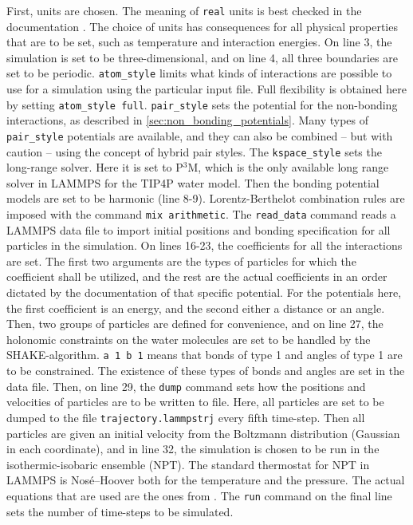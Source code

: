 First, units are chosen. The meaning of {\tt real} units is best checked in the documentation \cite{lammps:documentation}. The choice of units has consequences for all physical properties that are to be set, such as temperature and interaction energies. On line 3, the simulation is set to be three-dimensional, and on line 4, all three boundaries are set to be periodic. {\tt atom\_style} limits what kinds of interactions are possible to use for a simulation using the particular input file. Full flexibility is obtained here by setting {\tt atom\_style full}. {\tt pair\_style} sets the potential for the non-bonding interactions, as described in \ref{sec:non_bonding_potentials}. Many types of {\tt pair\_style} potentials are available, and they can also be combined -- but with caution -- using the concept of hybrid pair styles. The {\tt kspace\_style} sets the long-range solver. Here it is set to P$^3$M, which is the only available long range solver in LAMMPS for the TIP4P water model. Then the bonding potential models are set to be harmonic (line 8-9). Lorentz-Berthelot combination rules are imposed with the command {\tt mix arithmetic}. The {\tt read\_data} command reads a LAMMPS data file to import initial positions and bonding specification for all particles in the simulation. On lines 16-23, the coefficients for all the interactions are set. The first two arguments are the types of particles for which the coefficient shall be utilized, and the rest are the actual coefficients in an order dictated by the documentation of that specific potential. For the potentials here, the first coefficient is an energy, and the second either a distance or an angle. Then, two groups of particles are defined for convenience, and on line 27, the holonomic constraints on the water molecules are set to be handled by the SHAKE-algorithm. {\tt a 1 b 1} means that bonds of type 1 and angles of type 1 are to be constrained. The existence of these types of bonds and angles are set in the data file. Then, on line 29, the {\tt dump} command sets how the positions and velocities of particles are to be written to file. Here, all particles are set to be dumped to the file {\tt trajectory.lammpstrj} every fifth time-step. Then all particles are given an initial velocity from the Boltzmann distribution (Gaussian in each coordinate), and in line 32, the simulation is chosen to be run in the isothermic-isobaric ensemble (NPT). The standard thermostat for NPT in LAMMPS is Nosé--Hoover both for the temperature and the pressure. The actual equations that are used are the ones from \citet{shinoda2004rapid}.  The {\tt run} command on the final line sets the number of time-steps to be simulated.

